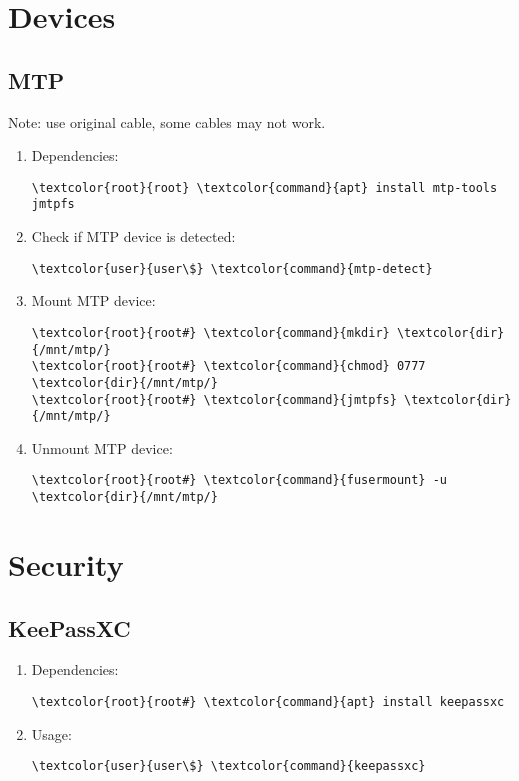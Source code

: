 \documentclass[10pt, a4paper, onecolumn, openany]{book} %
\begin{document}
\section{Devices}
\subsection{MTP}
Note: use original cable, some cables may not work.
\begin{enumerate}
    \item Dependencies:
\begin{Verbatim}[commandchars=\\\{\}]
\textcolor{root}{root} \textcolor{command}{apt} install mtp-tools jmtpfs
\end{Verbatim}
    \item Check if MTP device is detected:
\begin{Verbatim}[commandchars=\\\{\}]
\textcolor{user}{user\$} \textcolor{command}{mtp-detect}
\end{Verbatim}
    \item Mount MTP device:
\begin{Verbatim}[commandchars=\\\{\}]
\textcolor{root}{root#} \textcolor{command}{mkdir} \textcolor{dir}{/mnt/mtp/}
\textcolor{root}{root#} \textcolor{command}{chmod} 0777 \textcolor{dir}{/mnt/mtp/}
\textcolor{root}{root#} \textcolor{command}{jmtpfs} \textcolor{dir}{/mnt/mtp/}
\end{Verbatim}
    \item Unmount MTP device:
\begin{Verbatim}[commandchars=\\\{\}]
\textcolor{root}{root#} \textcolor{command}{fusermount} -u \textcolor{dir}{/mnt/mtp/}
\end{Verbatim}
\end{enumerate}
\section{Security}
\subsection{KeePassXC}
\begin{enumerate}
    \item Dependencies:
\begin{Verbatim}[commandchars=\\\{\}]
\textcolor{root}{root#} \textcolor{command}{apt} install keepassxc
\end{Verbatim}
    \item Usage:
\begin{Verbatim}[commandchars=\\\{\}]
\textcolor{user}{user\$} \textcolor{command}{keepassxc}
\end{Verbatim}
\end{enumerate}
\end{document}
